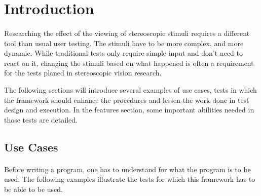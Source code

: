 \section{Introduction\label{Introduction}}
\paragraph{}
Researching the effect of the viewing of stereoscopic stimuli requires a different tool than usual user testing. The stimuli have to be more complex, and more dynamic. While traditional tests only require simple input and don't need to react on it, changing the stimuli based on what happened is often a requirement for the tests planed in stereoscopic vision research.

The following sections will introduce several examples of use cases, tests in which the framework should enhance the procedures and lessen the work done in test design and execution.
In the features section, some important abilities needed in those tests are detailed.

\subsection{Use Cases}
\paragraph{}
Before writing a program, one has to understand for what the program is to be used. The following examples illustrate the tests for which this framework has to be able to be used.


